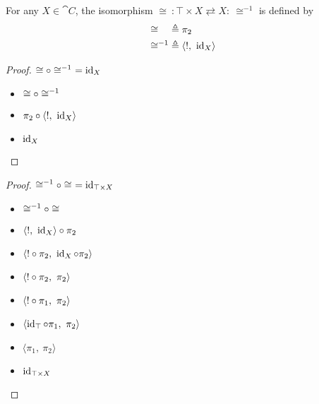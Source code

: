 \begin{lemma}\label{lemma:prod-term-iso}
  For any $X\in\cat{C}$, the isomorphism ${\cong~:\top\times X\rightleftarrows X :~\cong^{-1}}$ is defined by
  \begin{align*}
    \cong^{\phantom{-1}} & \triangleq \pi_2 \\
    \cong^{-1} & \triangleq \langle !,~\operatorname{id}_X \rangle
  \end{align*}

  \begin{proof}[Proof] $\cong\circ\cong^{-1}~= \operatorname{id}_X$
    \begin{itemize}
      \item[\phs] $\cong\circ\cong^{-1}$
      \item[\eqs] $\pi_2\circ\langle !,~\operatorname{id}_X\rangle$
      \item[\eqs] $\operatorname{id}_X$
        \qedhere
    \end{itemize}
  \end{proof}

  \begin{proof}[Proof]$\cong^{-1}\circ\cong~= \operatorname{id}_{\top\times X}$
    \begin{itemize}
      \item[\phs] $\cong^{-1}\circ\cong$
      \item[\eqs] $\langle !,~\operatorname{id}_X\rangle\circ\pi_2$

      \item[\eqs] $\langle !\circ\pi_2,~\operatorname{id}_X\circ\pi_2\rangle$
      \item[\eqs] $\langle !\circ\pi_2,~\pi_2\rangle$

        \marginnote{\Def-$\id$}

      \item[\eqs] $\langle !\circ\pi_1,~\pi_2\rangle$

      \item[\eqs] $\langle \operatorname{id}_\top\circ\pi_1,~\pi_2\rangle$

      \item[\eqs] $\langle \pi_1,~\pi_2\rangle$
        \marginnote{\Def-$\id$}

      \item[\eqs] $\operatorname{id}_{\top\times X}$
        \qedhere

    \end{itemize}
  \end{proof}
\end{lemma}

